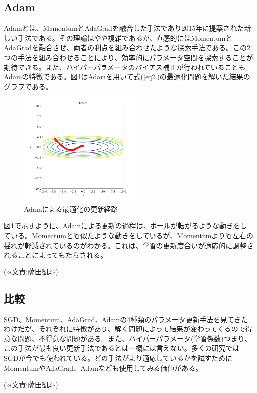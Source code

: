 \subsection{Adam}
{Adamとは、MomentumとAdaGradを融合した手法であり2015年に提案された新しい手法である。その理論はやや複雑であるが、直感的にはMomentumとAdaGradを融合させ、両者の利点を組み合わせたような探索手法である。この2つの手法を組み合わせることにより、効率的にパラメータ空間を探索することが期待できる。また、ハイパーパラメータのバイアス補正が行われていることもAdamの特徴である。図\ref{gr5}はAdamを用いて式(\ref{eq2})の最適化問題を解いた結果のグラフである。
\begin{figure}[H]
\centering
\includegraphics[width=6cm]{./figure/Adam.png}
\caption{Adamによる最適化の更新経路 \label{gr5}}
\end{figure}
図\ref{gr5}で示すように、Adamによる更新の過程は、ボールが転がるような動きをしている。Momentumとも似たような動きをしているが、Momentumよりも左右の揺れが軽減されているのがわかる。これは、学習の更新度合いが適応的に調整されることによってもたらされる。
\begin{flushright}
  (※文責:薩田凱斗)
\end{flushright}
}



\subsection{比較}
{SGD、Momentum、AdaGrad、Adamの4種類のパラメータ更新手法を見てきたわけだが、それぞれに特徴があり、解く問題によって結果が変わってくるので得意な問題、不得意な問題がある。また、ハイパーパラメータ(学習係数)つまり、この手法が最も良い更新手法であるとは一概には言えない。多くの研究ではSGDが今でも使われている。どの手法がより適応しているかを試すためにMomentumやAdaGrad、Adamなども使用してみる価値がある。
\begin{flushright}
  (※文責:薩田凱斗)
\end{flushright}
}
